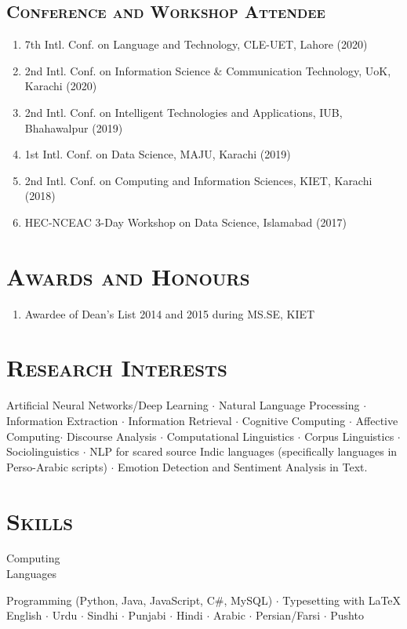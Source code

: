 \documentclass[a4paper, 10pt]{article}
\begin{document}
\subsection*{\normalfont\textsc{Conference and Workshop Attendee}}
\begin{enumerate}
\itemsep-4pt
\item 7th Intl. Conf. on Language and Technology, CLE-UET, Lahore (2020)
\item 2nd Intl. Conf. on Information Science \& Communication Technology, UoK, Karachi (2020)
\item 2nd Intl. Conf. on Intelligent Technologies and Applications, IUB, Bhahawalpur (2019)
\item 1st Intl. Conf. on Data Science, MAJU, Karachi (2019)
\item 2nd Intl. Conf. on Computing and Information Sciences, KIET, Karachi (2018)
\item HEC-NCEAC 3-Day Workshop on Data Science, Islamabad (2017) 
\end{enumerate}

\section*{\normalfont\textsc{Awards and Honours}}
\begin{enumerate}
\itemsep-4pt 
 \item Awardee of Dean's List 2014 and 2015 during MS.SE, KIET
\end{enumerate}

\section*{\normalfont\textsc{Research Interests}}
Artificial Neural Networks/Deep Learning $\cdot$ Natural Language Processing $\cdot$ Information Extraction $\cdot$ Information Retrieval $\cdot$ Cognitive Computing $\cdot$ Affective Computing$\cdot$ Discourse Analysis $\cdot$ Computational Linguistics $\cdot$  Corpus Linguistics $\cdot$ Sociolinguistics $\cdot$ NLP for scared source Indic languages (specifically languages in Perso-Arabic scripts) $\cdot$ Emotion Detection and Sentiment Analysis in Text.

\section*{\normalfont\textsc{Skills}}
\hfill\begin{minipage}{0.17\textwidth}
Computing\textcolor{lightgray}{\dotfill}\\
Languages\textcolor{lightgray}{\dotfill}
\end{minipage}%
\begin{minipage}{0.8\textwidth}
Programming (Python, Java, JavaScript, C\#, MySQL) $\cdot$ Typesetting with \LaTeX\\
English $\cdot$ Urdu $\cdot$ Sindhi $\cdot$ Punjabi $\cdot$ Hindi $\cdot$ Arabic $\cdot$ Persian/Farsi $\cdot$ Pushto 
\end{minipage}
\end{document}
